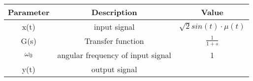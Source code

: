 \begin{tabular}{|c|c|c|}
    \hline
    Parameter & Description & Value \\
    \hline
    x(t) & input signal & $\sqrt{2}sin(t)\cdot\mu(t)$ \\
    \hline
    G(s) & Transfer function & $\frac{1}{1+s}$ \\
    \hline
    $\omega_0$ & angular frequency of input signal & 1\\ 
    \hline
    y(t) & output signal & \\    
    \hline
\end{tabular}
